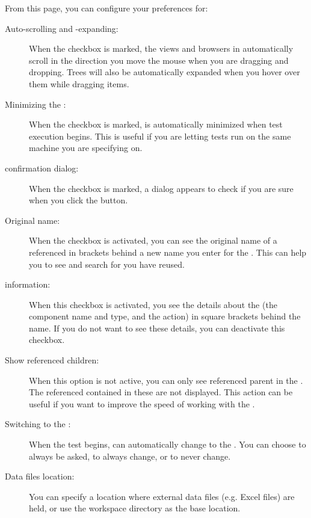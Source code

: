 From this page, you can configure your preferences for:
\begin{description}
\item [Auto-scrolling and -expanding:]{When the checkbox is marked, the views and browsers in \app{} automatically scroll in the direction you move the mouse when you are dragging and dropping. Trees will also be automatically expanded when you hover over them while dragging items.}
\item [Minimizing the \ite{}:]{When the checkbox is marked, \app{} is automatically minimized when test execution begins. This is useful if you are letting tests run on the same machine you are specifying on.}
\item [\gdaut{} confirmation dialog:]{When the checkbox is marked, a dialog appears to check if you are sure when you click the   button.}
\item [Original \gdcase{} name:]{When the checkbox is activated, you can see the original name of a referenced \gdcase{} in brackets behind a new name you enter for the \gdcase{}. This can help you to see and search for \gdcases{} you have reused. }
\item[\gdstep{} information:]{When this checkbox is activated, you see the details about the \gdstep{} (the component name and type, and the action) in square brackets behind the \gdstep{} name. If you do not want to see these details, you can deactivate this checkbox.}
\item[Show referenced children:]{When this option is not active, you can only see  referenced parent \gdcases{} in the \gdtestcasebrowser{}. The referenced \gdcases{} contained in these \gdcases{} are not displayed. This action can be useful if you want to improve the speed of working with the \ite{}.}
\item [Switching to the \execpersp{}:]{When the test begins, \app{} can automatically change to the \execpersp{}. You can choose to always be asked, to always change, or to never change. }
\item [Data files location:]{You can specify a location where external data files (e.g. Excel files) are held, or use the workspace directory as the base location. }
\end{description}

 

